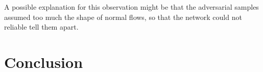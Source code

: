 \documentclass[conference]{IEEEtran}
\newcommand\note[2]{{\color{#1}#2}}
\newcommand\todo[1]{{\note{red}{TODO: #1}}}
\begin{document}

A possible explanation for this observation might be that the adversarial samples assumed too much the shape of normal flows, so that the network could not reliable tell them apart.



\section{Conclusion}
\end{document}
